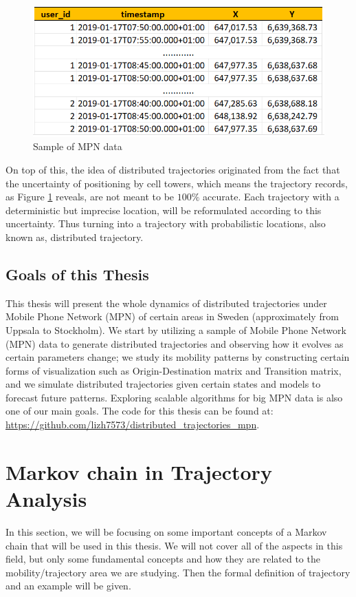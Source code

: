\documentclass[12pt]{article}
\theoremstyle{definition}
\begin{document}
\begin{figure}
  \centering
  \includegraphics[width=12cm]{mpn_sample.jpg}
  \caption{Sample of MPN data}
  \label{fig:mpn_sample}
\end{figure}

On top of this, the idea of distributed trajectories originated from the fact that the uncertainty of positioning by cell towers, which means the trajectory records, as Figure \ref{fig:mpn_sample} reveals, are not meant to be \(100\%\) accurate. Each trajectory with a deterministic but imprecise location, will be reformulated according to this uncertainty. Thus turning into a trajectory with probabilistic locations, also known as, distributed trajectory.

\subsection{Goals of this Thesis}
This thesis will present the whole dynamics of distributed trajectories under Mobile Phone Network (MPN) of certain areas in Sweden (approximately from Uppsala to Stockholm). We start by utilizing a sample of Mobile Phone Network (MPN) data to generate distributed trajectories and observing how it evolves as certain parameters change; we study its mobility patterns by constructing certain forms of visualization such as Origin-Destination matrix and Transition matrix, and we simulate distributed trajectories given certain states and models to forecast future patterns. Exploring scalable algorithms for big MPN data is also one of our main goals. The code for this thesis can be found at: \url{https://github.com/lizh7573/distributed_trajectories_mpn}. \newpage






\section{Markov chain in Trajectory Analysis}
In this section, we will be focusing on some important concepts of a Markov chain that will be used in this thesis. We will not cover all of the aspects in this field, but only some fundamental concepts and how they are related to the mobility/trajectory area we are studying. Then the formal definition of trajectory and an example will be given.
\end{document}
